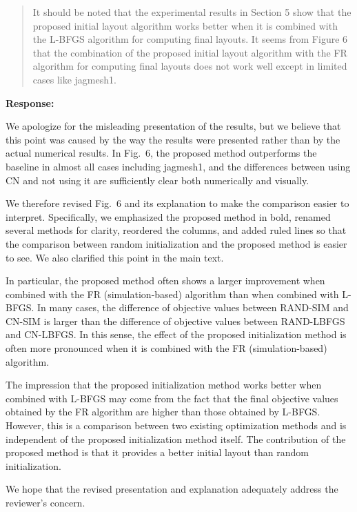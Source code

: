 \documentclass[11pt]{article}
\newcommand{\reviewercomment}[1]{%
  \begin{quote}
  \color{blue}
  #1
  \end{quote}
}
\newenvironment{response}{%
  \noindent\textbf{Response:}%
}{%
  \medskip
}
\begin{document}
\reviewercomment{
  It should be noted that the experimental results in Section 5 show that the proposed initial layout algorithm works better when it is combined with the L-BFGS algorithm for computing final layouts.
  It seems from Figure 6 that the combination of the proposed initial layout algorithm with the FR algorithm for computing final layouts does not work well except in limited cases like jagmesh1.
}

\begin{response}
  We apologize for the misleading presentation of the results, but we believe that this point was caused by the way the results were presented rather than by the actual numerical results.
  In Fig.~6, the proposed method outperforms the baseline in almost all cases including jagmesh1, and the differences between using CN and not using it are sufficiently clear both numerically and visually.

  We therefore revised Fig.~6 and its explanation to make the comparison easier to interpret. Specifically, we emphasized the proposed method in bold, renamed several methods for clarity, reordered the columns, and added ruled lines so that the comparison between random initialization and the proposed method is easier to see.
  We also clarified this point in the main text.

  In particular, the proposed method often shows a larger improvement when combined with the FR (simulation-based) algorithm than when combined with L-BFGS. In many cases, the difference of objective values between \textsf{RAND-SIM} and \textsf{CN-SIM} is larger than the difference of objective values between \textsf{RAND-LBFGS} and \textsf{CN-LBFGS}. In this sense, the effect of the proposed initialization method is often more pronounced when it is combined with the FR (simulation-based) algorithm.

  The impression that the proposed initialization method works better when combined with L-BFGS may come from the fact that the final objective values obtained by the FR algorithm are higher than those obtained by L-BFGS. However, this is a comparison between two existing optimization methods and is independent of the proposed initialization method itself. The contribution of the proposed method is that it provides a better initial layout than random initialization.

  We hope that the revised presentation and explanation adequately address the reviewer's concern.
\end{response}
\end{document}
